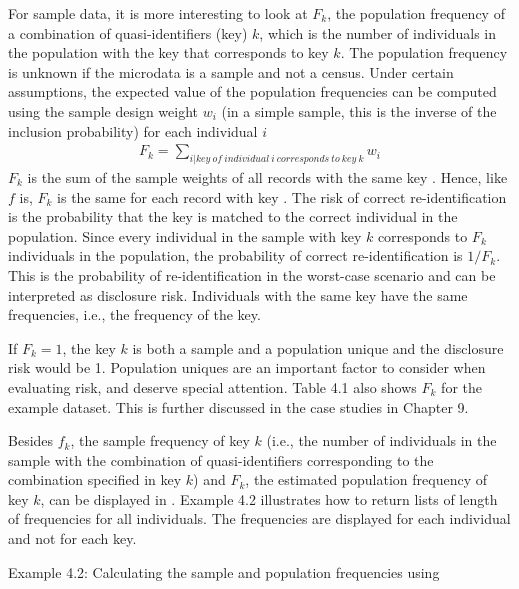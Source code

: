 \documentclass[letterpaper,10pt,english]{sphinxmanual}
\begin{document}
For sample data, it is more interesting to look at \(F_{k}\), the
population frequency of a combination of quasi-identifiers (key)
\(k\), which is the number of individuals in the population with the
key that corresponds to key \(k\). The population frequency
is unknown if the microdata is a sample and not a census. Under certain
assumptions, the expected value of the population frequencies can be
computed using the sample design weight \(w_{i}\) (in a simple
sample, this is the inverse of the inclusion probability) for each
individual \(i\)
\begin{equation*}
\begin{split}F_{k} = \sum_{i|key\ of\ individual\ i\ corresponds\ to\ key\ k}^{}w_{i}\end{split}
\end{equation*}
\(F_{k}\) is the sum of the sample weights of all records with the
same key . Hence, like \(f\) is, \(F_{k}\) is the same for
each record with key . The risk of correct re-identification is the
probability that the key is matched to the correct individual in the
population. Since every individual in the sample with key \(k\)
corresponds to \(F_{k}\) individuals in the population, the
probability of correct re-identification is \(1/F_{k}.\ \)This is
the probability of re-identification in the worst-case scenario and can
be interpreted as disclosure risk. Individuals with the same key have
the same frequencies, i.e., the frequency of the key.

If \(F_{k} = 1\), the key \(k\) is both a sample and a
population unique and the disclosure risk would be 1. Population uniques
are an important factor to consider when evaluating risk, and deserve
special attention. Table 4.1 also shows \(F_{k}\) for the example
dataset. This is further discussed in the case studies in Chapter 9.

Besides \(f_{k}\), the sample frequency of key
\(k\) (i.e., the number of individuals in the sample with
the combination of quasi-identifiers corresponding to the combination
specified in key \(k\)) and \(F_{k}\), the estimated population
frequency of key \(k\), can be displayed in . Example 4.2
illustrates how to return lists of length  of frequencies for all
individuals. The frequencies are displayed for each individual and not
for each key.

Example 4.2: Calculating the sample and population frequencies using
\end{document}
